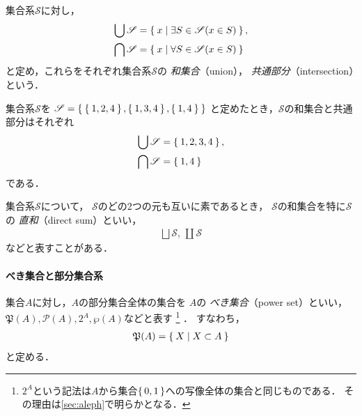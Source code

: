     集合系$\mathscr{S}$に対し，
    \begin{align}
      \bigcup \mathscr{S} & = \Set{ x \mid \exists S \in \mathscr{S} ( x \in S) },
      \label{eq:systemunion} \\
      \bigcap \mathscr{S} & = \Set{ x \mid \forall S \in \mathscr{S} ( x \in S) }
      \label{eq:systemintersection}
    \end{align}
    と定め，これらをそれぞれ集合系$\mathscr{S}$の
    \emph{和集合}（union），
    \emph{共通部分}（intersection）という．

    \begin{ex} \label{ex:systemuniin}
      集合系$\mathscr{S}$を
        $\mathscr{S} = \Set{ \Set{1,  2 , 4} ,  
         \Set{1,  3,  4},  \Set{1,  4}}$
      と定めたとき，$\mathscr{S}$の和集合と共通部分はそれぞれ
      \begin{align*}
        \bigcup \mathscr{S} & = \Set{1,  2,  3,  4} ,\\
        \bigcap \mathscr{S} & = \Set{ 1,  4 }
      \end{align*}
      である．
    \end{ex}

    集合系$\mathscr{S}$について，
    $\mathscr{S}$のどの2つの元も互いに素であるとき，
    $\mathscr{S}$の和集合を特に$\mathscr{S}$の
    \emph{直和}（direct sum）といい，
    \begin{align}
      \bigsqcup \mathscr{S} , \, \coprod \mathscr{S}
      \label{eq:systemdirectsum}
    \end{align}
    などと表すことがある．




   \paragraph{べき集合と部分集合系} 
    集合$A$に対し，$A$の部分集合全体の集合を
    $A$の
    \emph{べき集合}（power set）といい，
    $\mathfrak{P}(A) ,  \mathcal{P}(A),  2^A , \wp (A)$などと表す
    \footnote{$2^A$という記法は$A$から集合$\set{ 0,1}$への写像全体の集合と同じものである．
    その理由は\ref{sec:aleph}で明らかとなる．}
    ．
    すなわち，
    \begin{align}
      \mathfrak{P}(A) = \Set{ X \mid X \subset A}
      \label{eq:powerset}
    \end{align}
    と定める．
    
